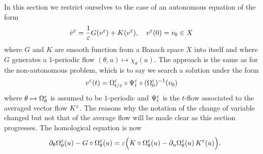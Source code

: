 In this section we restrict ourselves to the case of an autonomous
equation of the form 
\begin{align} \label{sec:autonomous:eq:pb_v}
  \dot v^\varepsilon = \frac{1}{\varepsilon} G(v^\varepsilon) + K(v^\varepsilon), 
  \quad v^\varepsilon(0) = v_0 \in X
\end{align}
where $G$ and $K$ are smooth function from a Banach space $X$ into itself
and where $G$ generates a $1$-periodic flow $(\theta,u) \mapsto
\chi_\theta(u)$. The approach is the same as for the non-autonomous
problem, which is to say we search a solution under the form 
\begin{align}
  v^\varepsilon(t) = \Omega^\varepsilon_{t/\varepsilon} \circ \Psi^\varepsilon_t \circ (\Omega^\varepsilon_0)^{-1} (v_0)
\end{align}
where $\theta \mapsto \Omega^\varepsilon_\theta$ is assumed to be $1$-periodic and
$\Psi^\varepsilon_t$ is the $t$-flow associated to the averaged vector flow
$K^\varepsilon$. The reasons why the notation of the change of variable changed
but not that of the average flow will be made clear as this section
progresses. The homological equation is now 
\begin{equation} \label{sec:autonomous:eq:homol}
  \quad \partial_\theta \Omega^\varepsilon_\theta(u) - G \circ \Omega^\varepsilon_\theta(u) 
  = \varepsilon \Big( K \circ \Omega^\varepsilon_\theta(u) 
    - \partial_u \Omega^\varepsilon_\theta(u) \, K^\varepsilon(u) \Big) .
\end{equation}

